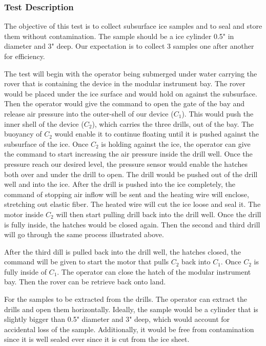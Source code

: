 \documentclass{article}
\begin{document}
\subsubsection{Test Description}
The objective of this test is to collect subsurface ice samples and to seal and store them without contamination. The sample should be a ice cylinder 0.5" in diameter and 3" deep. Our expectation is to collect 3 samples one after another for efficiency. 

The test will begin with the operator being submerged under water carrying the rover that is containing the device in the modular instrument bay. The rover would be placed under the ice surface and would hold on against the subsurface. Then the operator would give the command to open the gate of the bay and release air pressure into the outer-shell of our device ($C_1$).  This would push the inner shell of the device ($C_2$), which carries the three drills, out of the bay. The buoyancy of $C_2$ would enable it to continue floating until it is pushed against the subsurface of the ice. Once $C_2$ is holding against the ice, the operator can give the command to start increasing the air pressure inside the drill well. Once the pressure reach our desired level, the pressure sensor would enable the hatches both over and under the drill to open. The drill would be pushed out of the drill well and into the ice. After the drill is pushed into the ice completely, the command of stopping air inflow will be sent and the heating wire will enclose, stretching out elastic fiber. The heated wire will cut the ice loose and seal it. The  motor inside $C_2$ will then start pulling drill back into the drill well. Once the drill is fully inside, the hatches would be closed again. Then the second and third drill will go through the same process illustrated above. 

After the third dill is pulled back into the drill well, the hatches closed, the command will be given to start the motor that pulls $C_2$ back into $C_1$. Once $C_2$ is fully inside of $C_1$. The operator can close the hatch of the modular instrument bay. Then the rover can be retrieve back onto land. 

For the samples to be extracted from the drills. The operator can extract the drills and open them horizontally. Ideally, the sample would be a cylinder that is slightly bigger than 0.5" diameter and 3" deep, which would account for accidental loss of the sample. Additionally, it would be free from contamination since it is well sealed ever since it is cut from the ice sheet.
\end{document}
